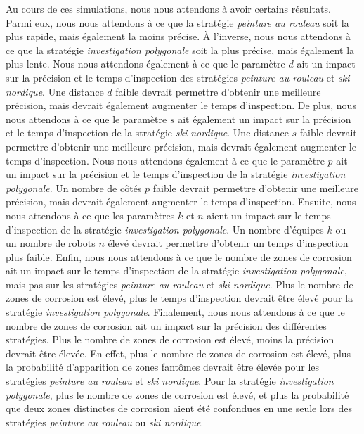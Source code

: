 \documentclass[english,RandD]{rapportPFE}  %
\begin{document}
		Au cours de ces simulations, nous nous attendons à avoir certains résultats.
		Parmi eux, nous nous attendons à ce que la stratégie \textit{peinture au rouleau} soit la plus rapide, mais également la moins précise.
		À l'inverse, nous nous attendons à ce que la stratégie \textit{investigation polygonale} soit la plus précise, mais également la plus lente.
		Nous nous attendons également à ce que le paramètre $d$ ait un impact sur la précision et le temps d'inspection des stratégies \textit{peinture au rouleau} et \textit{ski nordique}.
		Une distance $d$ faible devrait permettre d'obtenir une meilleure précision, mais devrait également augmenter le temps d'inspection.
		De plus, nous nous attendons à ce que le paramètre $s$ ait également un impact sur la précision et le temps d'inspection de la stratégie \textit{ski nordique}.
		Une distance $s$ faible devrait permettre d'obtenir une meilleure précision, mais devrait également augmenter le temps d'inspection.
		Nous nous attendons également à ce que le paramètre $p$ ait un impact sur la précision et le temps d'inspection de la stratégie \textit{investigation polygonale}.
		Un nombre de côtés $p$ faible devrait permettre d'obtenir une meilleure précision, mais devrait également augmenter le temps d'inspection.
		Ensuite, nous nous attendons à ce que les paramètres $k$ et $n$ aient un impact sur le temps d'inspection de la stratégie \textit{investigation polygonale}.
		Un nombre d'équipes $k$ ou un nombre de robots $n$ élevé devrait permettre d'obtenir un temps d'inspection plus faible.
		Enfin, nous nous attendons à ce que le nombre de zones de corrosion ait un impact sur le temps d'inspection de la stratégie \textit{investigation polygonale}, mais pas sur les stratégies \textit{peinture au rouleau} et \textit{ski nordique}.
		Plus le nombre de zones de corrosion est élevé, plus le temps d'inspection devrait être élevé pour la stratégie \textit{investigation polygonale}.
		Finalement, nous nous attendons à ce que le nombre de zones de corrosion ait un impact sur la précision des différentes stratégies.
		Plus le nombre de zones de corrosion est élevé, moins la précision devrait être élevée.
		En effet, plus le nombre de zones de corrosion est élevé, plus la probabilité d'apparition de zones fantômes devrait être élevée pour les stratégies \textit{peinture au rouleau} et \textit{ski nordique}.
		Pour la stratégie \textit{investigation polygonale}, plus le nombre de zones de corrosion est élevé, et plus la probabilité que deux zones distinctes de corrosion aient été confondues en une seule lors des stratégies \textit{peinture au rouleau} ou \textit{ski nordique}.
\end{document}
